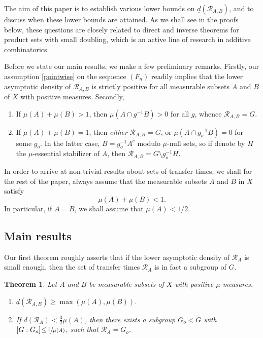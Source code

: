 \documentclass[11pt]{article}
\numberwithin{equation}{section}
\let\mathcal\mathscr
\newcommand{\cR}{\mathcal{R}}
\theoremstyle{plain}
\newtheorem{theorem}{Theorem}[section]
\theoremstyle{definition}
\begin{document}
The aim of this paper is to establish various lower bounds on $\underline{d}(\cR_{A,B})$, and to discuss when these lower bounds are attained. As we shall see in the proofs below, these questions are closely related to direct and inverse theorems for product sets with small doubling, which is an active line of research in additive combinatorics.

Before we state our main results, we make a few preliminary remarks. Firstly, our assumption \eqref{pointwise} on the sequence $(F_n)$ readily implies that the lower asymptotic density of $\cR_{A,B}$ is strictly positive for all measurable subsets $A$ and $B$ of $X$ with positive measures. Secondly,

\begin{enumerate}
\item
If $\mu(A) + \mu(B) > 1$, then $\mu(A \cap g^{-1}B) >0$ for all $g$, whence $\cR_{A,B} = G$.
\item
If $\mu(A) + \mu(B) = 1$, then \emph{either} $\cR_{A,B} = G$, or $\mu(A \cap g_o^{-1}B) = 0$ for some $g_o$.
In the latter case, $B = g_o^{-1}A^c$ modulo $\mu$-null sets, so if denote by $H$ the $\mu$-essential stabilizer of $A$,
then $\cR_{A,B} = G \setminus g_o^{-1} H$.
\end{enumerate}

In order to arrive at non-trivial results about sets of transfer times, we shall for the rest of the paper, always assume that the measurable
subsets $A$ and $B$ in $X$ satisfy
\begin{equation}
\label{standass}
\mu(A) + \mu(B) < 1.
\end{equation}
In particular, if $A = B$, we shall assume that $\mu(A) < 1/2$.

\subsection{Main results}

Our first theorem roughly asserts that if the lower asymptotic density of $\cR_A$ is small enough, then the set of transfer times $\cR_A$ is in fact a
subgroup of $G$.
\begin{theorem}
\label{thm1}
Let $A$ and $B$ be measurable subsets of $X$ with positive $\mu$-measures.

\begin{enumerate}
\item\label{thm1i}
$\underline{d}(\cR_{A,B}) \geq \max(\mu(A),\mu(B))$.
\item\label{thm1ii}
If $\underline{d}(\cR_A)\!<\!\frac{3}{2} \mu(A)$, then there exists a subgroup $G_o\!<\!G$ with
$[G : G_o]\!\leq\!\sfrac{1}{\mu(A)}$, such that $\cR_A = G_o$.
\end{enumerate}
\end{theorem}
\end{document}
